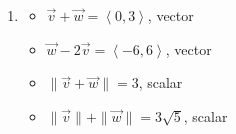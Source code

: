 \begin{enumerate}
\begin{multicols}{2}
\begin{itemize}
\end{itemize}

\end{multicols}

\begin{multicols}{2}

\begin{itemize}

\item $\| \vec{v} + \vec{w} \| = 12\sqrt{2}$, scalar
\item  $\| \vec{v} \| + \| \vec{w}\| = 38$, scalar

\end{itemize}

\end{multicols}

\begin{multicols}{2}

\begin{itemize}

\item $\| \vec{v} \| \vec{w} - \| \vec{w} \| \vec{v}  = \left<-34,-612\right>$, vector
\item $\|w\| \hat{v}= \left<-\frac{91}{25}, \frac{312}{25} \right>$, vector

\end{itemize}

\end{multicols}

\item  

\begin{multicols}{2}

\begin{itemize}

\item  $\vec{v} + \vec{w} = \left<0,3\right> $, vector
\item  $\vec{w}  - 2\vec{v}  = \left<-6,6 \right>$, vector

\end{itemize}

\end{multicols}

\begin{multicols}{2}

\begin{itemize}

\item $\| \vec{v} + \vec{w} \| = 3$, scalar
\item  $\| \vec{v} \| + \| \vec{w}\| = 3\sqrt{5}$, scalar


\end{itemize}
\end{multicols}
\end{enumerate}
